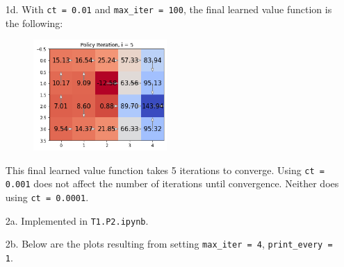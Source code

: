 \documentclass[submit]{harvardml}
\begin{document}
\begin{itemize}
    \item[1d.]
    With \texttt{ct = 0.01} and \texttt{max\_iter = 100}, the final learned value function is the 
    following:

    \begin{figure}[H]
        \centering
        \includegraphics[width=0.48\textwidth]{hw6_1d}
    \end{figure}

    This final learned value function takes 5 iterations to converge. Using 
    \texttt{ct = 0.001} does not affect the number of iterations until convergence.
    Neither does using \texttt{ct = 0.0001}.
    
    \item[2a.]
    Implemented in \texttt{T1.P2.ipynb}.
    
    \item[2b.]
    Below are the plots resulting from setting \texttt{max\_iter = 4}, \texttt{print\_every = 1}.


\end{itemize}
\end{document}
